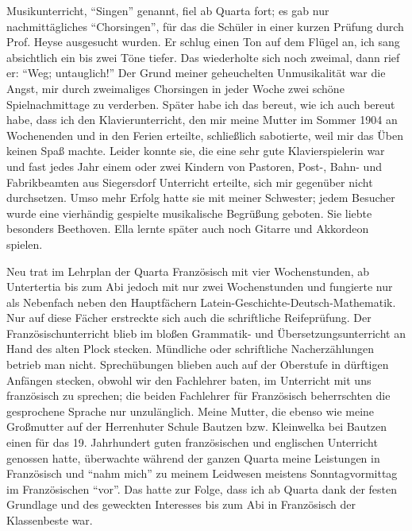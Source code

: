 \documentclass[a5paper,pagesize,10pt,twoside=true]{scrbook}
\begin{document}
Musikunterricht, \enquote{Singen} genannt, fiel ab Quarta fort; es gab nur nachmittägliches \enquote{Chorsingen}, für das die Schüler in einer kurzen Prüfung durch Prof. Heyse ausgesucht wurden. Er schlug einen Ton auf dem Flügel an, ich sang absichtlich ein bis zwei Töne tiefer. Das wiederholte sich noch zweimal, dann rief er: \enquote{Weg; untauglich!} Der Grund meiner geheuchelten Unmusikalität war die Angst, mir durch zweimaliges Chorsingen in jeder Woche zwei schöne Spielnachmittage zu verderben. Später habe ich das bereut, wie ich auch bereut habe, dass ich den Klavierunterricht, den mir meine Mutter im Sommer 1904 an Wochenenden und in den Ferien erteilte, schließlich sabotierte, weil mir das Üben keinen Spaß machte. Leider konnte sie, die eine sehr gute Klavierspielerin war und fast jedes Jahr einem oder zwei Kindern von Pastoren, Post-, Bahn- und Fabrikbeamten aus Siegersdorf Unterricht erteilte, sich mir gegenüber nicht durchsetzen. Umso mehr Erfolg hatte sie mit meiner Schwester; jedem Besucher wurde eine vierhändig gespielte musikalische Begrüßung geboten. Sie liebte besonders Beethoven. Ella lernte später auch noch Gitarre und Akkordeon spielen.

Neu trat im Lehrplan der Quarta Französisch mit vier Wochenstunden, ab Untertertia bis zum Abi jedoch mit nur zwei Wochenstunden und fungierte nur als Nebenfach neben den Hauptfächern Latein-Geschichte-Deutsch-Mathematik. Nur auf diese Fächer erstreckte sich auch die schriftliche Reifeprüfung. Der Französischunterricht blieb im bloßen Grammatik- und Übersetzungsunterricht an Hand des alten Plock stecken. Mündliche oder schriftliche Nacherzählungen betrieb man nicht. Sprechübungen blieben auch auf der Oberstufe in dürftigen Anfängen stecken, obwohl wir den Fachlehrer baten, im Unterricht mit uns französisch zu sprechen; die beiden Fachlehrer für Französisch beherrschten die gesprochene Sprache nur unzulänglich. Meine Mutter, die ebenso wie meine Großmutter auf der Herrenhuter Schule Bautzen bzw. Kleinwelka bei Bautzen einen für das 19. Jahrhundert guten französischen und englischen Unterricht genossen hatte, überwachte während der ganzen Quarta meine Leistungen in Französisch und \enquote{nahm mich} zu meinem Leidwesen meistens Sonntagvormittag im Französischen \enquote{vor}. Das hatte zur Folge, dass ich ab Quarta dank der festen Grundlage und des geweckten Interesses bis zum Abi in Französisch der Klassenbeste war.
\end{document}
